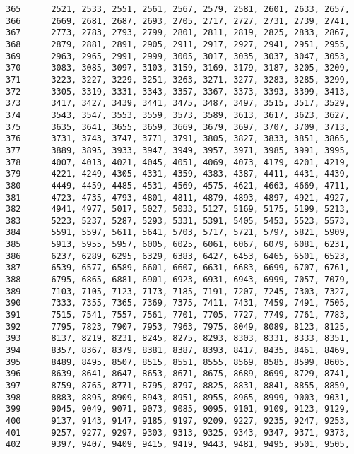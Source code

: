 \begin{Code}
\begin{verbatim}
365      2521, 2533, 2551, 2561, 2567, 2579, 2581, 2601, 2633, 2657,
366      2669, 2681, 2687, 2693, 2705, 2717, 2727, 2731, 2739, 2741,
367      2773, 2783, 2793, 2799, 2801, 2811, 2819, 2825, 2833, 2867,
368      2879, 2881, 2891, 2905, 2911, 2917, 2927, 2941, 2951, 2955,
369      2963, 2965, 2991, 2999, 3005, 3017, 3035, 3037, 3047, 3053,
370      3083, 3085, 3097, 3103, 3159, 3169, 3179, 3187, 3205, 3209,
371      3223, 3227, 3229, 3251, 3263, 3271, 3277, 3283, 3285, 3299,
372      3305, 3319, 3331, 3343, 3357, 3367, 3373, 3393, 3399, 3413,
373      3417, 3427, 3439, 3441, 3475, 3487, 3497, 3515, 3517, 3529,
374      3543, 3547, 3553, 3559, 3573, 3589, 3613, 3617, 3623, 3627,
375      3635, 3641, 3655, 3659, 3669, 3679, 3697, 3707, 3709, 3713,
376      3731, 3743, 3747, 3771, 3791, 3805, 3827, 3833, 3851, 3865,
377      3889, 3895, 3933, 3947, 3949, 3957, 3971, 3985, 3991, 3995,
378      4007, 4013, 4021, 4045, 4051, 4069, 4073, 4179, 4201, 4219,
379      4221, 4249, 4305, 4331, 4359, 4383, 4387, 4411, 4431, 4439,
380      4449, 4459, 4485, 4531, 4569, 4575, 4621, 4663, 4669, 4711,
381      4723, 4735, 4793, 4801, 4811, 4879, 4893, 4897, 4921, 4927,
382      4941, 4977, 5017, 5027, 5033, 5127, 5169, 5175, 5199, 5213,
383      5223, 5237, 5287, 5293, 5331, 5391, 5405, 5453, 5523, 5573,
384      5591, 5597, 5611, 5641, 5703, 5717, 5721, 5797, 5821, 5909,
385      5913, 5955, 5957, 6005, 6025, 6061, 6067, 6079, 6081, 6231,
386      6237, 6289, 6295, 6329, 6383, 6427, 6453, 6465, 6501, 6523,
387      6539, 6577, 6589, 6601, 6607, 6631, 6683, 6699, 6707, 6761,
388      6795, 6865, 6881, 6901, 6923, 6931, 6943, 6999, 7057, 7079,
389      7103, 7105, 7123, 7173, 7185, 7191, 7207, 7245, 7303, 7327, 
390      7333, 7355, 7365, 7369, 7375, 7411, 7431, 7459, 7491, 7505, 
391      7515, 7541, 7557, 7561, 7701, 7705, 7727, 7749, 7761, 7783,
392      7795, 7823, 7907, 7953, 7963, 7975, 8049, 8089, 8123, 8125,
393      8137, 8219, 8231, 8245, 8275, 8293, 8303, 8331, 8333, 8351,
394      8357, 8367, 8379, 8381, 8387, 8393, 8417, 8435, 8461, 8469,
395      8489, 8495, 8507, 8515, 8551, 8555, 8569, 8585, 8599, 8605,
396      8639, 8641, 8647, 8653, 8671, 8675, 8689, 8699, 8729, 8741,
397      8759, 8765, 8771, 8795, 8797, 8825, 8831, 8841, 8855, 8859,
398      8883, 8895, 8909, 8943, 8951, 8955, 8965, 8999, 9003, 9031,
399      9045, 9049, 9071, 9073, 9085, 9095, 9101, 9109, 9123, 9129,
400      9137, 9143, 9147, 9185, 9197, 9209, 9227, 9235, 9247, 9253,
401      9257, 9277, 9297, 9303, 9313, 9325, 9343, 9347, 9371, 9373,
402      9397, 9407, 9409, 9415, 9419, 9443, 9481, 9495, 9501, 9505,

\end{verbatim}
\end{Code}
